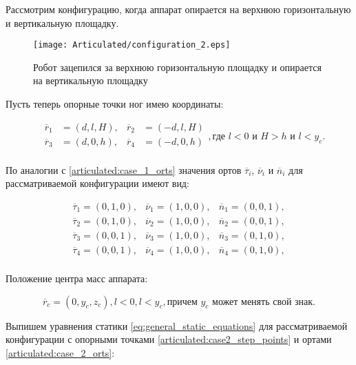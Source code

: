 Рассмотрим конфигурацию, когда аппарат опирается на верхнюю горизонтальную и вертикальную площадку.

\begin{figure}[ht]
  \centering
  \texttt{[image: Articulated/configuration\_2.eps]}
  \caption{Робот зацепился за верхнюю горизонтальную площадку и опирается на вертикальную площадку}
\end{figure}

Пусть теперь опорные точки ног имею координаты:

\begin{equation}
\label{articulated:case2_step_points}
\begin{alignedat}{3}
&\overline{r}_1 &= (d, l, H) , &\overline{r}_2 &= (-d, l, H) \\
&\overline{r}_3 &= (d, 0, h) , &\overline{r}_4 &= (-d, 0, h) \\
\end{alignedat}, \text{где $l < 0$ и $H > h$ и $l < y_c$.}
\end{equation}

По аналогии с \ref{articulated:case_1_orts} значения ортов $\overline{\tau}_i$, $\overline{\nu}_i$ и $\overline{n}_i$ для рассматриваемой конфигурации имеют вид:

\begin{equation}
\label{articulated:case_2_orts}
\begin{alignedat}{3}
  \overline{\tau}_1 = (0,1,0),&\overline{\nu}_1 = (1,0,0),&\overline{n}_1 = (0,0,1),\\
  \overline{\tau}_2 = (0,1,0),&\overline{\nu}_2 = (1,0,0),&\overline{n}_2 = (0,0,1),\\
  \overline{\tau}_3 = (0,0,1),&\overline{\nu}_3 = (1,0,0),&\overline{n}_3 = (0,1,0),\\
  \overline{\tau}_4 = (0,0,1),&\overline{\nu}_4 = (1,0,0),&\overline{n}_4 = (0,1,0),\\
\end{alignedat}
\end{equation}

Положение центра масс аппарата:

\begin{equation}
\label{articulated:case_2_center_of_gravity}
  \overline{r}_c = (0, y_c, z_c), l < 0, l < y_c,  \text{причем }y_c\text{ может менять свой знак.}
\end{equation}

Выпишем уравнения статики \ref{eq:general_static_equations} для рассматриваемой конфигурации с опорными точками \ref{articulated:case2_step_points} и ортами \ref{articulated:case_2_orts}:


